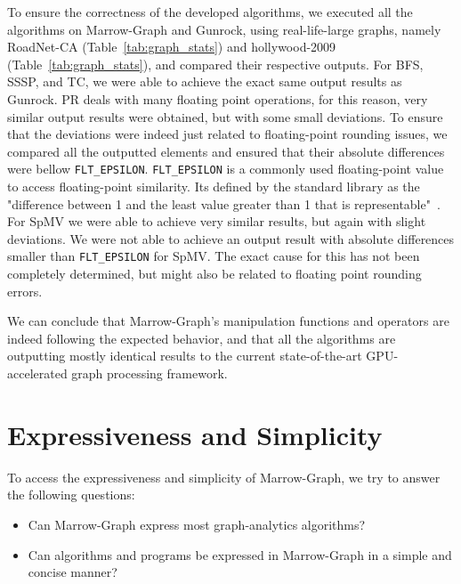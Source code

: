 To ensure the correctness of the developed algorithms, we executed all the algorithms on Marrow-Graph and Gunrock, using real-life-large graphs, namely RoadNet-CA (Table~\ref{tab:graph_stats}) and hollywood-2009 (Table~\ref{tab:graph_stats}), and compared their respective outputs. For \gls{BFS}, \gls{SSSP}, and \gls{TC}, we were able to achieve the exact same output results as Gunrock.  \gls{PR} deals with many floating point operations, for this reason, very similar output results were obtained, but with some small deviations. To ensure that the deviations were indeed just related to floating-point rounding issues, we compared all the outputted elements and ensured that their absolute differences were bellow \texttt{FLT\_EPSILON}. \texttt{FLT\_EPSILON} is a commonly used floating-point value to access floating-point similarity. Its defined by the standard library as the "difference between 1 and the least value greater than 1 that is representable"~\cite{cppreference}. For \gls{SpMV} we were able to achieve very similar results, but again with slight deviations. We were not able to achieve an output result with absolute differences smaller than \texttt{FLT\_EPSILON} for \gls{SpMV}. The exact cause for this has not been completely determined, but might also be related to floating point rounding errors.

We can conclude that Marrow-Graph's manipulation functions and operators are indeed following the expected behavior, and that all the algorithms are outputting mostly identical results to the current state-of-the-art \gls{GPU}-accelerated graph processing framework. 


\section{Expressiveness and Simplicity}
\label{sec:evaluation_expressiveness}

To access the expressiveness and simplicity of Marrow-Graph, we try to answer the following questions:
\begin{itemize}
    \item Can Marrow-Graph express most graph-analytics algorithms?
    \item Can algorithms and programs be expressed in Marrow-Graph in a simple and concise manner?
\end{itemize}

